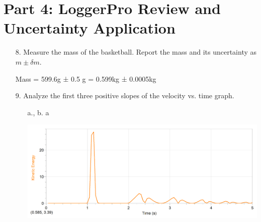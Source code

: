 \documentclass[12pt, letterpaper]{article}
\begin{document}
    \section*{Part 4: LoggerPro Review and Uncertainty Application}
    \begin{enumerate}
        \item [8.] Measure the mass of the basketball. Report the mass and its uncertainty as $m \pm \delta m$.
        
        \begin{mdframed}
            Mass = 599.6g ± 0.5 g = 0.599kg ± 0.0005kg
        \end{mdframed}

        \pagebreak

        \item[9.] Analyze the first three positive slopes of the velocity vs. time graph.
        
        \begin{itemize}
            \item [a., b.]a
            
            \begin{mdframed}
                \includegraphics{lab01images/image1.png}
            \end{mdframed}
        \end{itemize}
    \end{enumerate}
\end{document}
